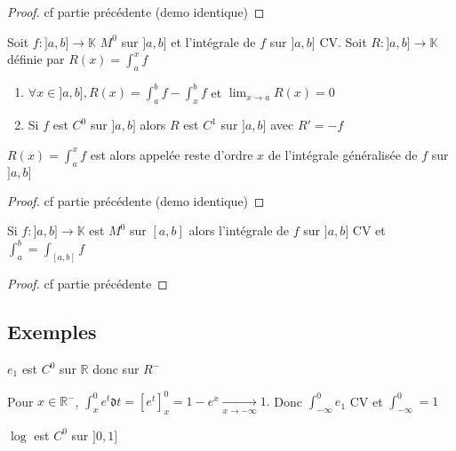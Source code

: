\documentclass[11pt,hidelinks]{book}
\theoremstyle{mytheoremstyle}
\theoremstyle{mytheoremstyle}
\theoremstyle{mytheoremstyle}
\theoremstyle{mytheoremstyle}
\theoremstyle{mytheoremstyle}
\theoremstyle{mytheoremstyle}
\theoremstyle{mytheoremstyle}
\theoremstyle{mytheoremstyle}
\theoremstyle{myproblemstyle}
\def\mbb#1{\mathbb{#1}}
\def\mfk#1{\mathfrak{#1}}
\def\bR{\mbb{R}}
\def\ib#1{\int_{a}^{b} #1}
\def\bK{\mbb{K}}
\def\abc{]a,b]}
\newcommand{\func}[3]{#1\colon#2\to#3}
\begin{document}
\begin{adjustwidth}{-2em}{-1em}
\begin{prop}
\begin{enumerate}
            \end{enumerate}
            \begin{proof}
                cf partie précédente (demo identique)
            \end{proof}
        \end{prop}
        \begin{theorem}
            Soit $\func{f}{\abc}{\bK}$ $M^0$ sur $\abc$ et l'intégrale 
            de $f$ sur $\abc$ CV. Soit $\func{R}{\abc}{\bK}$ définie par $R(x) = \int_{a}^{x} f$
            \begin{enumerate} 
            \item $\forall x \in \abc, R(x) = \ib{f} - \int_{x}^{b} f$ et $\lim_{x \to a} R(x) = 0$ 
            \item Si $f$ est $C^0$ sur $\abc$ alors $R$ est $C^1$ sur $\abc$ avec $R' = -f$
            \end{enumerate}
            \begin{rmq}
                $R(x) = \int_{a}^{x} f$ est alors appelée reste d'ordre $x$ de l'intégrale généralisée de $f$ sur $\abc$
            \end{rmq}
            \begin{proof}
                cf partie précédente (demo identique)
            \end{proof}
        \end{theorem}
        \begin{theorem}
            Si $\func{f}{\abc}{\bK}$ est $M^0$ sur $[a,b]$ alors l'intégrale 
            de $f$ sur $\abc$ CV et $\int_{a}^{b} = \int_{[a,b]} f$
            \begin{proof}
                cf partie précédente
            \end{proof}
        \end{theorem}
        \subsection{Exemples}

        \begin{ex}
            $e_1$ est $C^0$ sur $\bR$ donc sur $R^-$ 
            
            
            Pour $x \in \bR^-$, $\int_{x}^{0} e^t \mfk{d}t = \left[e^t\right]^0_x = 1 - e^x \xrightarrow[x \to -\infty]{} 1.$
            Donc $\int_{-\infty}^{0} e_1$ CV et $\int_{-\infty}^{0} = 1$
        \end{ex}

        \begin{ex}
            $\log$ est $C^0$ sur $]0,1]$ 



\end{ex}
\end{adjustwidth}
\end{document}
